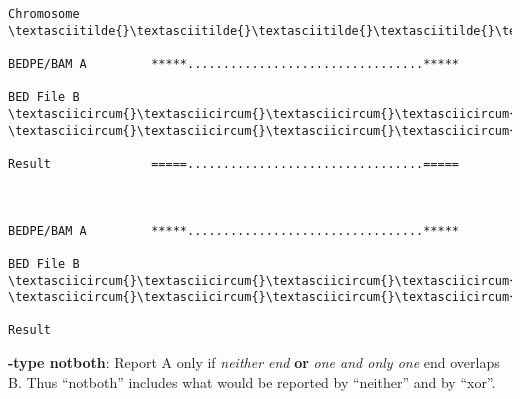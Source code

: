 \documentclass[letterpaper,10pt,english]{sphinxmanual}
\begin{document}
\begin{Verbatim}[commandchars=\\\{\}]
Chromosome  \textasciitilde{}\textasciitilde{}\textasciitilde{}\textasciitilde{}\textasciitilde{}\textasciitilde{}\textasciitilde{}\textasciitilde{}\textasciitilde{}\textasciitilde{}\textasciitilde{}\textasciitilde{}\textasciitilde{}\textasciitilde{}\textasciitilde{}\textasciitilde{}\textasciitilde{}\textasciitilde{}\textasciitilde{}\textasciitilde{}\textasciitilde{}\textasciitilde{}\textasciitilde{}\textasciitilde{}\textasciitilde{}\textasciitilde{}\textasciitilde{}\textasciitilde{}\textasciitilde{}\textasciitilde{}\textasciitilde{}\textasciitilde{}\textasciitilde{}\textasciitilde{}\textasciitilde{}\textasciitilde{}\textasciitilde{}\textasciitilde{}\textasciitilde{}\textasciitilde{}\textasciitilde{}\textasciitilde{}\textasciitilde{}\textasciitilde{}\textasciitilde{}\textasciitilde{}\textasciitilde{}\textasciitilde{}\textasciitilde{}\textasciitilde{}\textasciitilde{}\textasciitilde{}\textasciitilde{}\textasciitilde{}\textasciitilde{}\textasciitilde{}\textasciitilde{}\textasciitilde{}\textasciitilde{}\textasciitilde{}\textasciitilde{}\textasciitilde{}\textasciitilde{}\textasciitilde{}

BEDPE/BAM A         *****.................................*****

BED File B         \textasciicircum{}\textasciicircum{}\textasciicircum{}\textasciicircum{}\textasciicircum{}\textasciicircum{}\textasciicircum{}\textasciicircum{}                                          \textasciicircum{}\textasciicircum{}\textasciicircum{}\textasciicircum{}\textasciicircum{}\textasciicircum{}

Result              =====.................................=====



BEDPE/BAM A         *****.................................*****

BED File B         \textasciicircum{}\textasciicircum{}\textasciicircum{}\textasciicircum{}                                   \textasciicircum{}\textasciicircum{}\textasciicircum{}\textasciicircum{}\textasciicircum{}\textasciicircum{}

Result
\end{Verbatim}

\textbf{-type notboth}: Report A only if \emph{neither end} \textbf{or} \emph{one and only one} end overlaps B. Thus ``notboth''
includes what would be reported by ``neither'' and by ``xor''.
\end{document}
